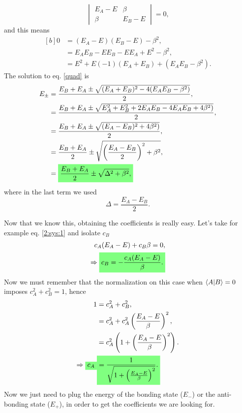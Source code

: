 \begin{questions}
\begin{solution}
\begin{equation}
\begin{vmatrix}
    E_A - E & \beta \\
    \beta & E_B - E
  \end{vmatrix} = 0,
  \label{2:det}
\end{equation}
and this means
\begin{equation}
  \begin{aligned}[b]
    0&=(E_A - E)(E_B - E) - \beta^2,\\
     &=E_AE_B - EE_B - EE_A + E^2 - \beta^2,\\
     &=E^2 + E(-1)(E_A + E_B) + (E_AE_B - \beta^2).
    \label{quad}
  \end{aligned}
\end{equation}
The solution to eq. \ref{quad} is
\begin{equation}
  \begin{aligned}[b]
    E_\pm &= \frac{E_B + E_A \pm \sqrt{(E_A + E_B)^2 - 4(E_AE_B - \beta^2)}}{2},\\
    &= \frac{E_B + E_A \pm \sqrt{E_A^2 + E_B^2 + 2E_AE_B - 4E_AE_B + 4\beta^2)}}{2},\\
    &= \frac{E_B + E_A \pm \sqrt{(E_A - E_B)^2 + 4\beta^2)}}{2},\\
    &= \frac{E_B + E_A}{2}\pm \sqrt{\left(\frac{E_A - E_B}{2}\right)^2 + \beta^2},\\
    &= \hlgreen{\frac{E_B + E_A}{2}\pm \sqrt{\Delta^2 + \beta^2},}
  \end{aligned}
\end{equation}
where in the last term we used
\begin{equation}
  \Delta = \frac{E_A - E_B}{2}.
\end{equation}

Now that we know this, obtaining the coefficients is really easy. Let's take for example eq. \ref{2:sys:1} and isolate $c_B$
\begin{equation}
  \begin{aligned}[b]
    c_A(E_A - E) + c_B\beta = 0,\\
    \Rightarrow \hlgreen{c_B = -\frac{c_A (E_A - E)}{\beta}.}
  \end{aligned}
\end{equation}
Now we must remember that the normalization on this case when $\braket{A|B} = 0$ imposes $c_A^2 + c_B^2 = 1$, hence
\begin{equation}
  \begin{aligned}[b]
    1 &= c_A^2 + c_B^2 ,\\
    &=c_A^2 + c_A^2\left( \frac{E_A - E}{\beta}\right)^2,\\
    &= c_A^2 \left(1+\left( \frac{E_A - E}{\beta}\right)^2\right).\\
    \Rightarrow \hlgreen{c_A} &\hlgreen{= \frac{1}{\sqrt{1+\left( \frac{E_A - E}{\beta}\right)^2}}.}
  \end{aligned}
\end{equation}
Now we just need to plug the energy of the bonding state ($E_-$) or the anti-bonding state ($E_+$), in order to get the coefficients we are looking for.


\end{solution}
\end{questions}
